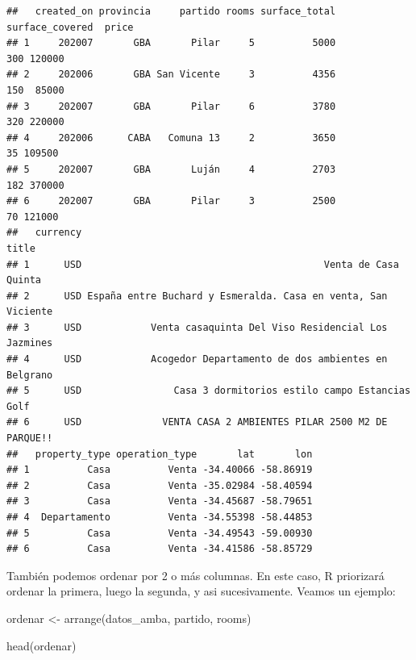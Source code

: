 \documentclass[
  spanish,
]{book}
\newenvironment{Shaded}{\begin{snugshade}}{\end{snugshade}}
\newcommand{\FunctionTok}[1]{\textcolor[rgb]{0.00,0.00,0.00}{#1}}
\newcommand{\NormalTok}[1]{#1}
\newcommand{\OtherTok}[1]{\textcolor[rgb]{0.56,0.35,0.01}{#1}}
\begin{document}
\begin{verbatim}
##   created_on provincia     partido rooms surface_total surface_covered  price
## 1     202007       GBA       Pilar     5          5000             300 120000
## 2     202006       GBA San Vicente     3          4356             150  85000
## 3     202007       GBA       Pilar     6          3780             320 220000
## 4     202006      CABA   Comuna 13     2          3650              35 109500
## 5     202007       GBA       Luján     4          2703             182 370000
## 6     202007       GBA       Pilar     3          2500              70 121000
##   currency                                                         title
## 1      USD                                          Venta de Casa Quinta
## 2      USD España entre Buchard y Esmeralda. Casa en venta, San Viciente
## 3      USD            Venta casaquinta Del Viso Residencial Los Jazmines
## 4      USD            Acogedor Departamento de dos ambientes en Belgrano
## 5      USD                Casa 3 dormitorios estilo campo Estancias Golf
## 6      USD              VENTA CASA 2 AMBIENTES PILAR 2500 M2 DE PARQUE!!
##   property_type operation_type       lat       lon
## 1          Casa          Venta -34.40066 -58.86919
## 2          Casa          Venta -35.02984 -58.40594
## 3          Casa          Venta -34.45687 -58.79651
## 4  Departamento          Venta -34.55398 -58.44853
## 5          Casa          Venta -34.49543 -59.00930
## 6          Casa          Venta -34.41586 -58.85729
\end{verbatim}

También podemos ordenar por 2 o más columnas. En este caso, R priorizará ordenar la primera, luego la segunda, y asi sucesivamente. Veamos un ejemplo:

\begin{Shaded}
\begin{Highlighting}[]
\NormalTok{ordenar }\OtherTok{\textless{}{-}} \FunctionTok{arrange}\NormalTok{(datos\_amba, partido, rooms)}

\FunctionTok{head}\NormalTok{(ordenar)}
\end{Highlighting}
\end{Shaded}
\end{document}
